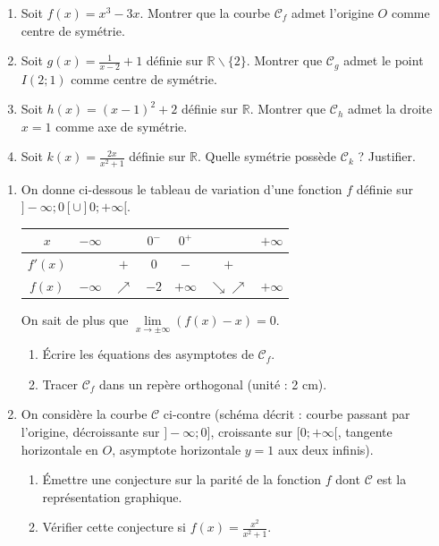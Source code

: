\documentclass[11pt]{article}
\def\setminus{\mathbin{\backslash}}\let\smallsetminus\setminus
\begin{document}
\begin{exercice}
\begin{enumerate}
    \item Soit $f(x) = x^3 - 3x$. Montrer que la courbe $\mathcal{C}_f$ admet l'origine $O$ comme centre de symétrie.
    \item Soit $g(x) = \frac{1}{x-2} + 1$ définie sur $\mathbb{R}\setminus\{2\}$. Montrer que $\mathcal{C}_g$ admet le point $I(2;1)$ comme centre de symétrie.
    \item Soit $h(x) = (x-1)^2 + 2$ définie sur $\mathbb{R}$. Montrer que $\mathcal{C}_h$ admet la droite $x=1$ comme axe de symétrie.
    \item Soit $k(x) = \frac{2x}{x^2+1}$ définie sur $\mathbb{R}$. Quelle symétrie possède $\mathcal{C}_k$ ? Justifier.
\end{enumerate}
\end{exercice}

\begin{exercice}
\begin{enumerate}
    \item On donne ci-dessous le tableau de variation d'une fonction $f$ définie sur $]-\infty;0[ \cup ]0;+\infty[$.
    \begin{center}
    \begin{tabular}{|c|c|c|c|c|c|c|}
    \hline
    $x$ & $-\infty$ & & $0^-$ & $0^+$ & & $+\infty$ \\ \hline
    $f'(x)$ & & $+$ & $0$ & $-$ & $+$ & \\ \hline
    $f(x)$ & $-\infty$ & $\nearrow$ & $-2$ & $+\infty$ & $\searrow \nearrow$ & $+\infty$ \\ \hline
    \end{tabular}
    \end{center}
    On sait de plus que $\lim\limits_{x \to \pm\infty} (f(x) - x) = 0$.
    \begin{enumerate}
        \item Écrire les équations des asymptotes de $\mathcal{C}_f$.
        \item Tracer $\mathcal{C}_f$ dans un repère orthogonal (unité : 2 cm).
    \end{enumerate}
    \item On considère la courbe $\mathcal{C}$ ci-contre (schéma décrit : courbe passant par l'origine, décroissante sur $]-\infty;0]$, croissante sur $[0;+\infty[$, tangente horizontale en $O$, asymptote horizontale $y=1$ aux deux infinis).
    \begin{enumerate}
        \item Émettre une conjecture sur la parité de la fonction $f$ dont $\mathcal{C}$ est la représentation graphique.
        \item Vérifier cette conjecture si $f(x) = \frac{x^2}{x^2+1}$.
    \end{enumerate}
\end{enumerate}
\end{exercice}
\end{document}
